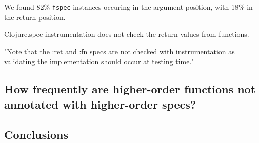 We found 82\% \texttt{fspec} instances occuring in the argument position,
with 18\% in the return position.

Clojure.spec instrumentation does not check the return values from functions.

"Note that the :ret and :fn specs are not checked with instrumentation as validating the implementation should occur at testing time."


\subsection{How frequently are higher-order functions not annotated with higher-order specs?}


\subsection{Conclusions}

